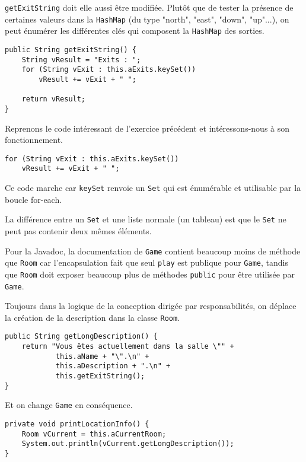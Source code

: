 \begin{exercise}[subtitle=keySet]

\verb|getExitString| doit elle aussi être modifiée. Plutôt que de tester la présence de certaines valeurs dans la \verb|HashMap| (du type "north", "east", "down", "up"...), on peut énumérer les différentes clés qui composent la \verb|HashMap| des sorties.

\begin{verbatim}
public String getExitString() {
    String vResult = "Exits : ";
    for (String vExit : this.aExits.keySet())
        vResult += vExit + " ";

    return vResult;
}
\end{verbatim}
\end{exercise}

\begin{exercise}[subtitle=Fonctionnement de keySet et Javadoc]

Reprenons le code intéressant de l'exercice précédent et intéressons-nous à son fonctionnement.

\begin{verbatim}
for (String vExit : this.aExits.keySet())
    vResult += vExit + " ";
\end{verbatim}

Ce code marche car \verb|keySet| renvoie un \verb|Set| qui est énumérable et utilisable par la boucle for-each.

La différence entre un \verb|Set| et une liste normale (un tableau) est que le \verb|Set| ne peut pas contenir deux mêmes éléments.

Pour la Javadoc, la documentation de \verb|Game| contient beaucoup moins de méthode que \verb|Room| car l'encapsulation fait que seul \verb|play| est publique pour \verb|Game|, tandis que \verb|Room| doit exposer beaucoup plus de méthodes \verb|public| pour être utilisée par \verb|Game|.

\end{exercise}

\begin{exercise}[subtitle=getLongDescription]

Toujours dans la logique de la conception dirigée par responsabilités, on déplace la création de la description dans la classe \verb|Room|.

\begin{verbatim}
public String getLongDescription() {
    return "Vous êtes actuellement dans la salle \"" +
            this.aName + "\".\n" +
            this.aDescription + ".\n" +
            this.getExitString();
}
\end{verbatim}

Et on change \verb|Game| en conséquence.

\begin{verbatim}
private void printLocationInfo() {
    Room vCurrent = this.aCurrentRoom;
    System.out.println(vCurrent.getLongDescription());
}
\end{verbatim}
\end{exercise}

